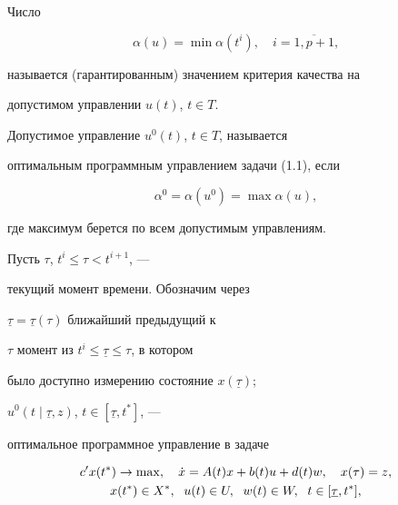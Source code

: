 \begin{defns}


Число


$$


\alpha(u)=\min\alpha(t^i),\quad i = \overline{1,p+1},


$$


называется (гарантированным) значением критерия качества на


допустимом управлении $u(t)$, $t \in T$.


\end{defns}





\begin{defns}


Допустимое управление $u^0(t)$, $t \in T$, называется


оптимальным программным управлением задачи (1.1), если


$$


\alpha^0=\alpha(u^0)=\max\alpha(u),


$$


где максимум берется по всем допустимым управлениям.


\end{defns}





Пусть $\tau$, $t^i \le \tau < t^{i+1}$, ---


текущий момент времени. Обозначим через


$\underline{\tau}=\underline{\tau}(\tau)$ ближайший предыдущий к


$\tau$ момент из $t^i \le \underline{\tau} \le \tau$, в котором


было доступно измерению состояние $x(\underline{\tau})$;


$u^0(t\mid\underline{\tau},z)$, $t \in [\underline{\tau},t ^*]$, ---


оптимальное программное управление в задаче


\begin{gather}


c'x(t^{*})\rightarrow \max,\quad \Dot x=A(t)x+b(t)u+d(t)w,


\quad x(\tau)=z,\\


%


x(t^*) \in X^*,\ \; u(t) \in U,


\ \; w(t) \in W,\ \; t \in [\underline{\tau}, t^*],\notag


\end{gather}


